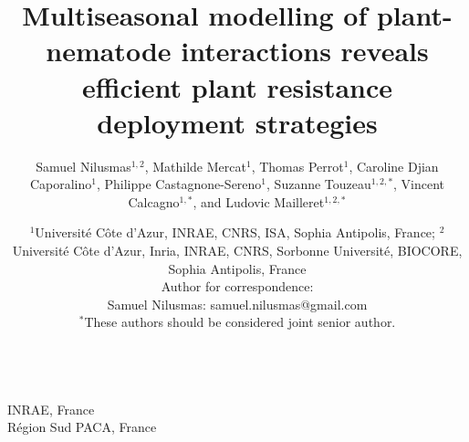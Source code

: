 \title{Multiseasonal modelling of plant-nematode interactions reveals efficient plant resistance deployment strategies}

\author{Samuel Nilusmas$^{1,2}$, Mathilde Mercat$^1$, Thomas
Perrot$^1$, Caroline Djian Caporalino$^1$, 
Philippe Castagnone-Sereno$^1$, Suzanne Touzeau$^{1,2,*}$, Vincent
Calcagno$^{1,*}$,  and Ludovic Mailleret$^{1,2,*}$}

\date{$^1$Université Côte d'Azur, INRAE, CNRS, ISA, Sophia Antipolis, France;
  $^2$Université Côte d'Azur, Inria, INRAE, CNRS, Sorbonne Université,
  BIOCORE, Sophia Antipolis, France\\[1ex]
  Author for correspondence: \\
  Samuel Nilusmas: samuel.nilusmas@gmail.com\\[1ex]
  $^*$These authors should be considered joint senior author.
}
\maketitle




\bigskip
\par\noindent


\bigskip
\par{}\\
INRAE, France\\
Région Sud PACA, France 

